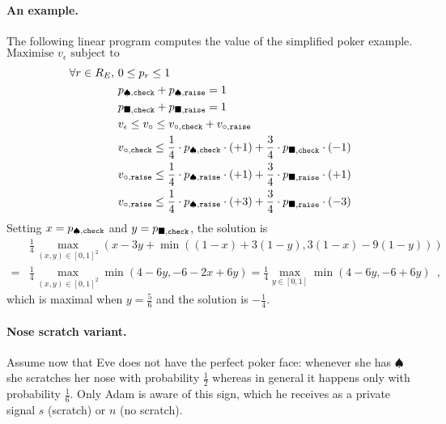 \paragraph{An example.}

The following linear program computes the value
of the simplified poker example.
$\text{Maximise $v_{\epsilon}$ subject to}$
\begin{align*}
\forall r \in R_E,~& 0\leq p_r \leq 1\\
&p_{\spadesuit,{\tt check} } +  p_{\spadesuit,{\tt raise} } = 1\\
&p_{\blacksquare,{\tt check} } +  p_{\blacksquare,{\tt raise} } = 1\\
&v_\epsilon \leq v_\circ \leq v_{\circ, {\tt check}} + v_{\circ, {\tt raise}}\\
&v_{\circ, {\tt check}}\leq  \frac{1}{4} \cdot p_{\spadesuit,{\tt check} } \cdot (+1) 
+ \frac{3}{4} \cdot p_{\blacksquare,{\tt check} } \cdot (-1)\\
&v_{\circ, {\tt raise}} \leq \frac{1}{4} \cdot p_{\spadesuit,{\tt raise} } \cdot (+1) + \frac{3}{4} \cdot p_{\blacksquare,{\tt raise} } \cdot (+1)\\
&v_{\circ, {\tt raise}} \leq \frac{1}{4} \cdot p_{\spadesuit,{\tt raise} } \cdot (+3) + \frac{3}{4} \cdot p_{\blacksquare,{\tt raise} } \cdot (-3)
\end{align*}
Setting $x=p_{\spadesuit,{\tt check} }$
and $y=  p_{\blacksquare,{\tt check} }$,
the solution is
\begin{align*}
&
\frac{1}{4}\max_{(x,y)\in[0,1]^2}
\left(
{x - 3y}
+
\min\left(
{(1-x) +  3 (1-y)},
{3(1-x) - 9(1-y)}
 \right)\right)\\
 =&
 \frac{1}{4}\max_{(x,y)\in[0,1]^2}
\min\left(
4 - 6y,
-6 -2x + 6y   
\right)
=
 \frac{1}{4}\max_{y\in[0,1]}
\min\left(
4 - 6y,
-6 + 6y   
\right)
 \enspace,
\end{align*}
which is maximal when $y=\frac{5}{6}$
and the solution is $-\frac{1}{4}$.

\paragraph{Nose scratch variant.}
Assume now that Eve does not have the perfect poker face:
whenever she has $\spadesuit$ she scratches
her nose with probability $\frac{1}{2}$ whereas
in general it happens only with probability $\frac{1}{6}$.
Only Adam is aware of this sign,
which he receives
as a private signal $s$ (scratch) or $n$ (no scratch).

